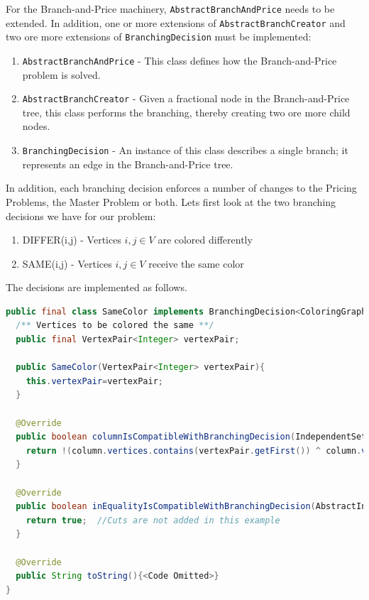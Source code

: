 \documentclass[a4paper]{article}
\newenvironment{myblock}[1]{%
    \tcolorbox[beamer,%
    noparskip,breakable,
    colback=lightBlueCodeBlock,colframe=darkBlueCodeBlock,%
    colbacklower=darkBlueCodeBlock!75!lightBlueCodeBlock,%
    coltitle=blueTitleCodeBlock,
    title=#1]}%
    {\endtcolorbox}
\newcommand{\code}[1]{\lstinline[language=java, style=seminar]!#1!}
\begin{document}
For the Branch-and-Price machinery, \code{AbstractBranchAndPrice} needs to be extended. In addition, one or more extensions of \code{AbstractBranchCreator} and two ore more extensions of \code{BranchingDecision} must be implemented:
\begin{enumerate}[nolistsep]
 \item \code{AbstractBranchAndPrice} - This class defines how the Branch-and-Price problem is solved.
 \item \code{AbstractBranchCreator} - Given a fractional node in the Branch-and-Price tree, this class performs the branching, thereby creating two ore more child nodes.
 \item \code{BranchingDecision} - An instance of this class describes a single branch; it represents an edge in the Branch-and-Price tree.
\end{enumerate}
In addition, each branching decision enforces a number of changes to the Pricing Problems, the Master Problem or both. 
Lets first look at the two branching decisions we have for our problem:
\begin{enumerate}
 \item DIFFER(i,j) - Vertices $i,j\in V$ are colored differently
 \item SAME(i,j) - Vertices $i,j\in V$ receive the same color
\end{enumerate}
The decisions are implemented as follows.
\begin{myblock}{Branching decision 1: SAME}
\begin{lstlisting}[language=java, style=eclipseArticle, xleftmargin=2em]  
public final class SameColor implements BranchingDecision<ColoringGraph, IndependentSet> {
  /** Vertices to be colored the same **/
  public final VertexPair<Integer> vertexPair;

  public SameColor(VertexPair<Integer> vertexPair){
    this.vertexPair=vertexPair;
  }

  @Override
  public boolean columnIsCompatibleWithBranchingDecision(IndependentSet column) {
    return !(column.vertices.contains(vertexPair.getFirst()) ^ column.vertices.contains(vertexPair.getSecond()));
  }

  @Override
  public boolean inEqualityIsCompatibleWithBranchingDecision(AbstractInequality inequality) {
    return true;  //Cuts are not added in this example
  }

  @Override
  public String toString(){<Code Omitted>}
}
\end{lstlisting}
\end{myblock}
\end{document}
